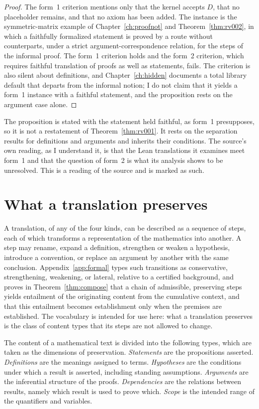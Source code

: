 \begin{proof}
The form~1 criterion mentions only that the kernel accepts $D$, that no placeholder remains, and that no axiom has been added. The instance is the symmetric-matrix example of Chapter~\ref{ch:proofnot} and Theorem~\ref{thm:rv002}, in which a faithfully formalized statement is proved by a route without counterparts, under a strict argument-correspondence relation, for the steps of the informal proof. The form~1 criterion holds and the form~2 criterion, which requires faithful translation of proofs as well as statements, fails. The criterion is also silent about definitions, and Chapter~\ref{ch:hidden} documents a total library default that departs from the informal notion; I do not claim that it yields a form~1 instance with a faithful statement, and the proposition rests on the argument case alone.
\end{proof}

The proposition is stated with the statement held faithful, as form~1 presupposes, so it is not a restatement of Theorem~\ref{thm:rv001}. It rests on the separation results for definitions and arguments and inherits their conditions. The source's own reading, as I understand it, is that the Lean translations it examines meet form~1 and that the question of form~2 is what its analysis shows to be unresolved. This is a reading of the source and is marked as such.

\section{What a translation preserves}

A translation, of any of the four kinds, can be described as a sequence of steps, each of which transforms a representation of the mathematics into another. A step may rename, expand a definition, strengthen or weaken a hypothesis, introduce a convention, or replace an argument by another with the same conclusion. Appendix~\ref{app:formal} types such transitions as conservative, strengthening, weakening, or lateral, relative to a certified background, and proves in Theorem~\ref{thm:compose} that a chain of admissible, preserving steps yields entailment of the originating content from the cumulative context, and that this entailment becomes establishment only when the premises are established. The vocabulary is intended for use here: what a translation preserves is the class of content types that its steps are not allowed to change.

\begin{definition}
\label{def:contenttypes}
The content of a mathematical text is divided into the following types, which are taken as the dimensions of preservation. \emph{Statements} are the propositions asserted. \emph{Definitions} are the meanings assigned to terms. \emph{Hypotheses} are the conditions under which a result is asserted, including standing assumptions. \emph{Arguments} are the inferential structure of the proofs. \emph{Dependencies} are the relations between results, namely which result is used to prove which. \emph{Scope} is the intended range of the quantifiers and variables.
\end{definition}

